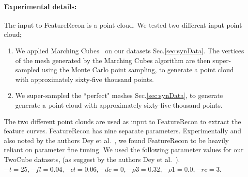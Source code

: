 \paragraph{Experimental details:} The input to FeatureRecon is a point cloud. We tested two different input point cloud;
\begin{enumerate}
	\item We applied Marching Cubes~\cite{lc-mchr3-87} on our datasets Sec.\ref{sec:synData}. The vertices of the mesh generated by the Marching Cubes algorithm are then super-sampled using the Monte Carlo point sampling, to generate a point cloud with approximately sixty-five thousand points.
	\item We super-sampled the ``perfect" meshes Sec.\ref{sec:synData}, to generate generate a point cloud with approximately sixty-five thousand points.
\end{enumerate}
The two different point clouds are used as input to FeatureRecon to extract the feature curves. 
FeatureRecon has nine separate parameters. Experimentally and also noted by the authors Dey et al.~\cite{Dey2013}, we found FeatureRecon to be heavily reliant on parameter fine tuning. We used the following parameter values for our TwoCube datasets, (as suggest by the authors Dey et al.~\cite{Dey2013}). 
$-t = 25,-fl = 0.04, -cl = 0.06, -dc = 0, -\rho3 = 0.32, -\rho1 = 0.0, -rc = 3$.

